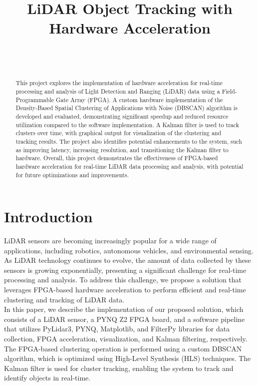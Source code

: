 \documentclass[journal]{IEEEtran} %
\begin{document}
\title{LiDAR Object Tracking with Hardware Acceleration}


\author{%
    \\%
    \\%
}

\maketitle

\begin{abstract}
This project explores the implementation of hardware acceleration for real-time processing and analysis of Light Detection and Ranging (LiDAR) data using a Field-Programmable Gate Array (FPGA). A custom hardware implementation of the Density-Based Spatial Clustering of Applications with Noise (DBSCAN) algorithm is developed and evaluated, demonstrating significant speedup and reduced resource utilization compared to the software implementation. A Kalman filter is used to track clusters over time, with graphical output for visualization of the clustering and tracking results. The project also identifies potential enhancements to the system, such as improving latency, increasing resolution, and transitioning the Kalman filter to hardware. Overall, this project demonstrates the effectiveness of FPGA-based hardware acceleration for real-time LiDAR data processing and analysis, with potential for future optimizations and improvements.
\end{abstract}

\section{Introduction}
LiDAR sensors are becoming increasingly popular for a wide range of applications, including robotics, autonomous vehicles, and environmental sensing. As LiDAR technology continues to evolve, the amount of data collected by these sensors is growing exponentially, presenting a significant challenge for real-time processing and analysis. To address this challenge, we propose a solution that leverages FPGA-based hardware acceleration to perform efficient and real-time clustering and tracking of LiDAR data.\\

In this paper, we describe the implementation of our proposed solution, which consists of a LiDAR sensor, a PYNQ Z2 FPGA board, and a software pipeline that utilizes PyLidar3, PYNQ, Matplotlib, and FilterPy libraries for data collection, FPGA acceleration, visualization, and Kalman filtering, respectively. The FPGA-based clustering operation is performed using a custom DBSCAN algorithm, which is optimized using High-Level Synthesis (HLS) techniques. The Kalman filter is used for cluster tracking, enabling the system to track and identify objects in real-time.\\
\end{document}

